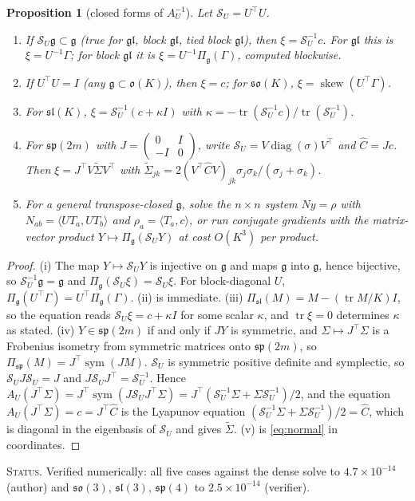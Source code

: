 \documentclass[11pt]{article}
\newtheorem{proposition}[theorem]{Proposition}
\theoremstyle{definition}
\theoremstyle{remark}
\newcommand{\g}{\mathfrak{g}}
\newcommand{\gl}{\mathfrak{gl}}
\newcommand{\tr}{\operatorname{tr}}
\newcommand{\sym}{\operatorname{sym}}
\newcommand{\ip}[2]{\langle #1, #2\rangle}
\newcommand{\status}[1]{\par\smallskip\noindent\textsc{Status.} #1\par\smallskip}
\begin{document}
\begin{proposition}[closed forms of $A_U^{-1}$]\label{prop:closed}
Let $\mathcal{S}_U=U^\top U$.
\begin{enumerate}
\item[(i)] If $\mathcal{S}_U\g\subset\g$ (true for $\gl$, block $\gl$, tied block $\gl$), then $\xi=\mathcal{S}_U^{-1}c$. For $\gl$ this is $\xi=U^{-1}\Gamma$; for block $\gl$ it is $\xi=U^{-1}\Pi_\g(\Gamma)$, computed blockwise.
\item[(ii)] If $U^\top U=I$ (any $\g\subset\mathfrak{o}(K)$), then $\xi=c$; for $\mathfrak{so}(K)$, $\xi=\operatorname{skew}(U^\top\Gamma)$.
\item[(iii)] For $\mathfrak{sl}(K)$, $\xi=\mathcal{S}_U^{-1}(c+\kappa I)$ with $\kappa=-\tr(\mathcal{S}_U^{-1}c)/\tr(\mathcal{S}_U^{-1})$.
\item[(iv)] For $\mathfrak{sp}(2m)$ with $J=\begin{pmatrix}0&I\\-I&0\end{pmatrix}$, write $\mathcal{S}_U=V\operatorname{diag}(\sigma)V^\top$ and $\hat C=Jc$. Then $\xi=J^\top V\tilde\Sigma V^\top$ with $\tilde\Sigma_{jk}=2(V^\top\hat CV)_{jk}\sigma_j\sigma_k/(\sigma_j+\sigma_k)$.
\item[(v)] For a general transpose-closed $\g$, solve the $n\times n$ system $Ny=\rho$ with $N_{ab}=\ip{UT_a}{UT_b}$ and $\rho_a=\ip{T_a}{c}$, or run conjugate gradients with the matrix-vector product $Y\mapsto\Pi_\g(\mathcal{S}_UY)$ at cost $O(K^3)$ per product.
\end{enumerate}
\end{proposition}
\begin{proof}
(i) The map $Y\mapsto\mathcal{S}_UY$ is injective on $\g$ and maps $\g$ into $\g$, hence bijective, so $\mathcal{S}_U^{-1}\g=\g$ and $\Pi_\g(\mathcal{S}_U\xi)=\mathcal{S}_U\xi$. For block-diagonal $U$, $\Pi_\g(U^\top\Gamma)=U^\top\Pi_\g(\Gamma)$. (ii) is immediate. (iii) $\Pi_{\mathfrak{sl}}(M)=M-(\tr M/K)I$, so the equation reads $\mathcal{S}_U\xi=c+\kappa I$ for some scalar $\kappa$, and $\tr\xi=0$ determines $\kappa$ as stated. (iv) $Y\in\mathfrak{sp}(2m)$ if and only if $JY$ is symmetric, and $\Sigma\mapsto J^\top\Sigma$ is a Frobenius isometry from symmetric matrices onto $\mathfrak{sp}(2m)$, so $\Pi_{\mathfrak{sp}}(M)=J^\top\sym(JM)$. $\mathcal{S}_U$ is symmetric positive definite and symplectic, so $\mathcal{S}_UJ\mathcal{S}_U=J$ and $J\mathcal{S}_UJ^\top=\mathcal{S}_U^{-1}$. Hence $A_U(J^\top\Sigma)=J^\top\sym(J\mathcal{S}_UJ^\top\Sigma)=J^\top(\mathcal{S}_U^{-1}\Sigma+\Sigma\mathcal{S}_U^{-1})/2$, and the equation $A_U(J^\top\Sigma)=c=J^\top\hat C$ is the Lyapunov equation $(\mathcal{S}_U^{-1}\Sigma+\Sigma\mathcal{S}_U^{-1})/2=\hat C$, which is diagonal in the eigenbasis of $\mathcal{S}_U$ and gives $\tilde\Sigma$. (v) is \eqref{eq:normal} in coordinates.
\end{proof}
\status{Verified numerically: all five cases against the dense solve to $4.7\times10^{-14}$ (author) and $\mathfrak{so}(3)$, $\mathfrak{sl}(3)$, $\mathfrak{sp}(4)$ to $2.5\times10^{-14}$ (verifier).}
\end{document}
